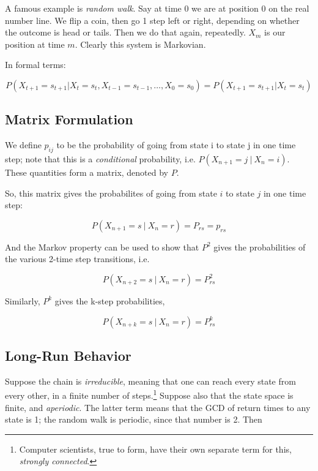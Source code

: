 A famous example is \textit{random walk}.  Say at time 0 we are at
position 0 on the real number line.  We flip a coin, then go 1 step left
or right, depending on whether the outcome is head or tails.  Then we do
that again, repeatedly.  $X_m$ is our position at time $m$.  Clearly
this system is Markovian.

In formal terms:

\begin{equation}
\label{containshidden}
P(X_{t+1}=s_{t+1}|X_{t}=s_{t},X_{t-1}=s_{t-1},\ldots ,X_{0}=s_{0})=P(X_{t+1}=s_{t+1}|X_{t}=s_{t})
\end{equation}

\subsection{Matrix Formulation}

We define $p_{ij}$ to be the probability of going from state i to state
j in one time step; note that this is a {\it conditional} probability,
i.e. $P(X_{n+1} = j ~|~ X_n = i)$.  These quantities form a matrix,
denoted by $P$.

So, this matrix gives the probabilites of going from state $i$ to state
$j$ in one time step:

\begin{equation}
P(X_{n+1} = s ~|~ X_n = r) = P_{rs} = p_{rs}
\end{equation}

And the Markov property can be used to show that $P^2$ gives the
probabilities of the various 2-time step transitions, i.e.

\begin{equation}
P(X_{n+2} = s ~|~ X_n = r) = P^2_{rs}
\end{equation}

Similarly, $P^k$ gives the k-step probabilities,

\begin{equation}
\label{kstep}
P(X_{n+k} = s ~|~ X_n = r) = P^k_{rs}
\end{equation}

\subsection{Long-Run Behavior}

Suppose the chain is \textit{irreducible}, meaning that one can reach
every state from every other, in a finite number of
steps.\footnote{Computer scientists, true to form, have their own
separate term for this, \textit{strongly connected}.}  Suppose also that
the state space is finite, and \textit{aperiodic}.  The latter term
means that the GCD of return times to any state is 1; the random walk is
periodic, since that number is 2.  Then 

